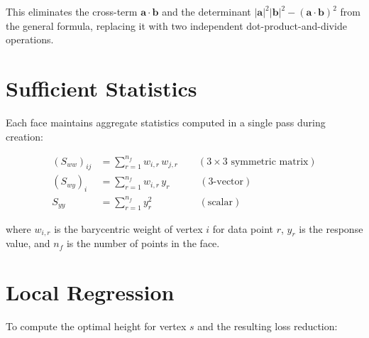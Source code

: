 \documentclass{article}
\begin{document}
This eliminates the cross-term $\mathbf{a} \cdot \mathbf{b}$ and the determinant $|\mathbf{a}|^2 |\mathbf{b}|^2 - (\mathbf{a} \cdot \mathbf{b})^2$ from the general formula, replacing it with two independent dot-product-and-divide operations.

\section{Sufficient Statistics}

Each face maintains aggregate statistics computed in a single pass during creation:

\begin{align}
    (S_{ww})_{ij} &= \sum_{r=1}^{n_f} w_{i,r} \, w_{j,r} \qquad (3 \times 3 \text{ symmetric matrix}) \\
    (S_{wy})_i &= \sum_{r=1}^{n_f} w_{i,r} \, y_r \qquad\quad (3\text{-vector}) \\
    S_{yy} &= \sum_{r=1}^{n_f} y_r^2 \qquad\qquad\;\;\, (\text{scalar})
\end{align}

where $w_{i,r}$ is the barycentric weight of vertex $i$ for data point $r$, $y_r$ is the response value, and $n_f$ is the number of points in the face.

\section{Local Regression}

To compute the optimal height for vertex $s$ and the resulting loss reduction:
\end{document}
